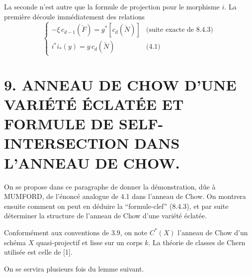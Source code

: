 \documentclass[11pt]{article}
\begin{document}
La seconde n'est autre que la formule de projection pour le morphisme $i$. La première découle immédiatement des relations
\[
\begin{cases}
-\xi\,c_{d-1}(\check F)=g^*[c_d(\check N)]&\text{(suite exacte de 8.4.3)}\\
i^*i_*(y)=y\,c_d(\check N)&\text{(4.1)}
\end{cases}
\]

\section*{9. ANNEAU DE CHOW D'UNE VARIÉTÉ ÉCLATÉE ET FORMULE DE SELF-INTERSECTION DANS L'ANNEAU DE CHOW.}

On se propose dans ce paragraphe de donner la démonstration, dûe à MUMFORD, de l'énoncé analogue de 4.1 dans l'anneau de Chow. On montrera ensuite comment on peut en déduire la ``formule-clef'' (8.4.3), et par suite déterminer la structure de l'anneau de Chow d'une variété éclatée.

Conformément aux conventions de 3.9, on note $C^*(X)$ l'anneau de Chow d'un schéma $X$ quasi-projectif et lisse sur un corps $k$. La théorie de classes de Chern utilisée est celle de [1].

On se servira plusieurs fois du lemme suivant.
\end{document}
